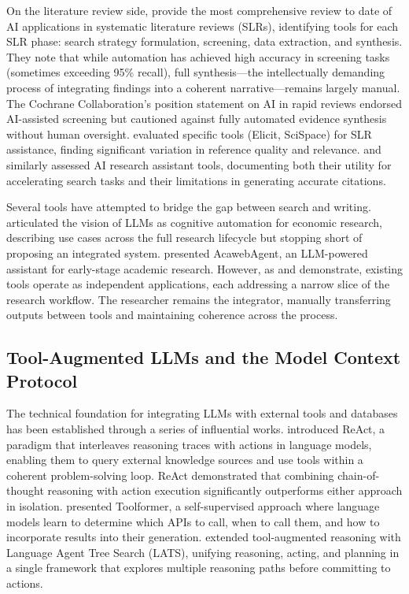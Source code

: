 \documentclass{article}
\begin{document}
On the literature review side, \citet{bolanos2024ai_lit_reviews} provide the most comprehensive review to date of AI applications in systematic literature reviews (SLRs), identifying tools for each SLR phase: search strategy formulation, screening, data extraction, and synthesis. They note that while automation has achieved high accuracy in screening tasks (sometimes exceeding 95\% recall), full synthesis---the intellectually demanding process of integrating findings into a coherent narrative---remains largely manual. The Cochrane Collaboration's position statement on AI in rapid reviews \citep{gartlehner2025cochrane} endorsed AI-assisted screening but cautioned against fully automated evidence synthesis without human oversight. \citet{djukic2025slr} evaluated specific tools (Elicit, SciSpace) for SLR assistance, finding significant variation in reference quality and relevance. \citet{preisler2024correctness} and \citet{hayn2024quality} similarly assessed AI research assistant tools, documenting both their utility for accelerating search tasks and their limitations in generating accurate citations.

Several tools have attempted to bridge the gap between search and writing. \citet{korinek2023language} articulated the vision of LLMs as cognitive automation for economic research, describing use cases across the full research lifecycle but stopping short of proposing an integrated system. \citet{yang2024acawebagent} presented AcawebAgent, an LLM-powered assistant for early-stage academic research. However, as \citet{preisler2024correctness} and \citet{hayn2024quality} demonstrate, existing tools operate as independent applications, each addressing a narrow slice of the research workflow. The researcher remains the integrator, manually transferring outputs between tools and maintaining coherence across the process.

\subsection{Tool-Augmented LLMs and the Model Context Protocol}

The technical foundation for integrating LLMs with external tools and databases has been established through a series of influential works. \citet{yao2022react} introduced ReAct, a paradigm that interleaves reasoning traces with actions in language models, enabling them to query external knowledge sources and use tools within a coherent problem-solving loop. ReAct demonstrated that combining chain-of-thought reasoning with action execution significantly outperforms either approach in isolation. \citet{schick2023toolformer} presented Toolformer, a self-supervised approach where language models learn to determine which APIs to call, when to call them, and how to incorporate results into their generation. \citet{zhou2023lats} extended tool-augmented reasoning with Language Agent Tree Search (LATS), unifying reasoning, acting, and planning in a single framework that explores multiple reasoning paths before committing to actions.
\end{document}
